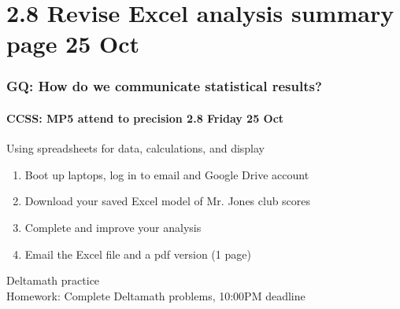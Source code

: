 \documentclass{beamer}
\begin{document}
  \section{2.8 Revise Excel analysis summary page 25 Oct}
  \frame
  {
    \frametitle{GQ: How do we communicate statistical results?}
    \framesubtitle{CCSS: MP5 attend to precision \hfill \alert{2.8 Friday 25 Oct}}

    \begin{block}{Using spreadsheets for data, calculations, and display}
      \begin{enumerate}
        \item Boot up laptops, log in to email and Google Drive account
        \item Download your saved Excel model of Mr. Jones club scores
        \item Complete and improve your analysis
        \item Email the Excel file and a pdf version (1 page)
    \end{enumerate}
    \end{block}
    Deltamath practice\\ \smallskip
    Homework: Complete Deltamath problems, 10:00PM deadline
  }
\end{document}
